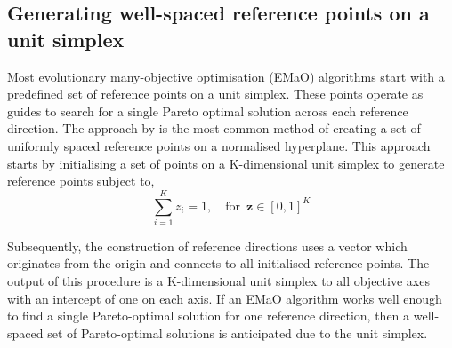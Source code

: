 \documentclass[mscthesis, 11pt]{usiinfthesis}
\theoremstyle{newdefinition}
\begin{document}
\subsection{Generating well-spaced reference points on a unit simplex}\label{ref_points}
Most evolutionary many-objective optimisation (EMaO) algorithms start with a predefined set of reference points on a unit simplex. These points operate as guides to search for a single Pareto optimal solution across each reference direction. The approach by \cite{das_normal-boundary_1998} is the most common method of creating a set of uniformly spaced reference points on a normalised hyperplane. This approach starts by initialising a set of points on a K-dimensional unit simplex to generate reference points subject to,
\begin{equation}
    \sum_{i=1}^K z_i = 1, \quad \text{for} \enspace \mathbf{z} \in [0, 1]^K
\end{equation}

Subsequently, the construction of reference directions uses a vector which originates from the origin and connects to all initialised reference points. The output of this procedure is a K-dimensional unit simplex to all objective axes with an intercept of one on each axis. 
If an EMaO algorithm works well enough to find a single Pareto-optimal solution for one reference direction, then a well-spaced set of Pareto-optimal solutions is anticipated due to the unit simplex. 
\end{document}
